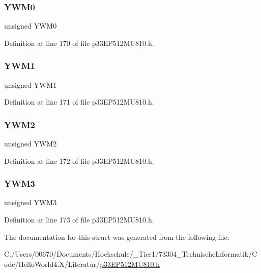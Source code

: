 \subsubsection{\texorpdfstring{Y\+W\+M0}{YWM0}}
{\footnotesize\ttfamily unsigned Y\+W\+M0}



Definition at line 170 of file p33\+E\+P512\+M\+U810.\+h.

\mbox{\label{structtag_m_o_d_c_o_n_b_i_t_s_a32061a0eabe2e53a2f85a15a2decdc44}} 
\subsubsection{\texorpdfstring{Y\+W\+M1}{YWM1}}
{\footnotesize\ttfamily unsigned Y\+W\+M1}



Definition at line 171 of file p33\+E\+P512\+M\+U810.\+h.

\mbox{\label{structtag_m_o_d_c_o_n_b_i_t_s_aa85fd7204197339c212550ad20cf18a9}} 
\subsubsection{\texorpdfstring{Y\+W\+M2}{YWM2}}
{\footnotesize\ttfamily unsigned Y\+W\+M2}



Definition at line 172 of file p33\+E\+P512\+M\+U810.\+h.

\mbox{\label{structtag_m_o_d_c_o_n_b_i_t_s_a496663bd9b54082d576633589dd75bf5}} 
\subsubsection{\texorpdfstring{Y\+W\+M3}{YWM3}}
{\footnotesize\ttfamily unsigned Y\+W\+M3}



Definition at line 173 of file p33\+E\+P512\+M\+U810.\+h.



The documentation for this struct was generated from the following file\+:\begin{DoxyCompactItemize}
\item 
C\+:/\+Users/00670/\+Documents/\+Hochschule/\+\_\+\+Tier1/73304\+\_\+\+Technische\+Informatik/\+Code/\+Hello\+World4.\+X/\+Literatur/\hyperlink{p33_e_p512_m_u810_8h}{p33\+E\+P512\+M\+U810.\+h}\end{DoxyCompactItemize}
